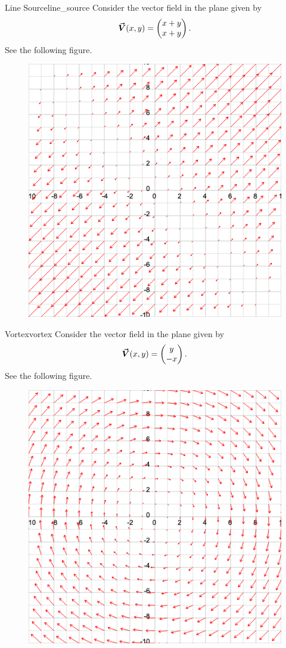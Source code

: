                 \begin{ex}{Line Source}{line_source}
                Consider the vector field in the plane given by
                \[
                \boldsymbol{\vec{V}}(x,y)=\begin{pmatrix} x + y\\ x+y \end{pmatrix}.
                \]
                See the following figure.
                \begin{figure}[H]
                    \centering
                    \includegraphics[width=.6\textwidth]{Figures_Part_6/v_field_1.png}
                \end{figure}
                \end{ex}
                
                \begin{ex}{Vortex}{vortex}
                Consider the vector field in the plane given by
                \[
                \boldsymbol{\vec{V}}(x,y)=\begin{pmatrix} y \\ -x \end{pmatrix}.
                \]
                See the following figure.
                \begin{figure}[H]
                    \centering
                    \includegraphics[width=.6\textwidth]{Figures_Part_6/v_field_3.png}
                \end{figure}
                \end{ex}
                        
